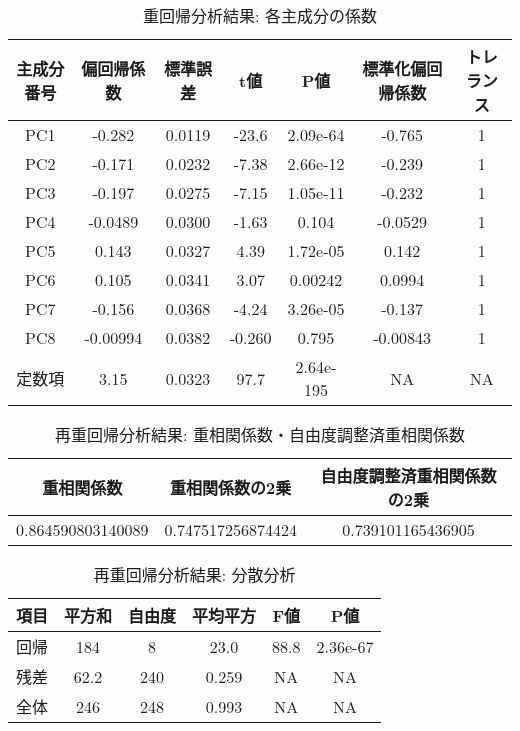 \documentclass[11pt,a4paper, uplatex]{jsarticle}
\begin{document}
\begin{table}[htbp]
  \begin{center}
    \caption{重回帰分析結果: 各主成分の係数}
    \begin{tabular}{c|c|c|c|c|c|c}
      \hline
      主成分番号 & 偏回帰係数 & 標準誤差 & t値 & P値 & 標準化偏回帰係数 & トレランス \\ \hline \hline
      PC1 & -0.282 & 0.0119 & -23.6 & 2.09e-64 & -0.765 & 1 \\
      PC2 & -0.171 & 0.0232 & -7.38 & 2.66e-12 & -0.239 & 1 \\
      PC3 & -0.197 & 0.0275 & -7.15 & 1.05e-11 & -0.232 & 1 \\
      PC4 & -0.0489 & 0.0300 & -1.63 & 0.104 & -0.0529 & 1 \\
      PC5 & 0.143 & 0.0327 & 4.39 & 1.72e-05 & 0.142 & 1 \\
      PC6 & 0.105 & 0.0341 & 3.07 & 0.00242 & 0.0994 & 1 \\
      PC7 & -0.156 & 0.0368 & -4.24 & 3.26e-05 & -0.137 & 1 \\
      PC8 & -0.00994 & 0.0382 & -0.260 & 0.795 & -0.00843 & 1 \\
      定数項 & 3.15 & 0.0323 & 97.7 & 2.64e-195 & NA & NA \\
    \end{tabular}
    \label{one}
  \end{center}
\end{table}

\begin{table}[htbp]
  \begin{center}
    \caption{再重回帰分析結果: 重相関係数・自由度調整済重相関係数}
    \begin{tabular}{c|c|c}
      \hline
      重相関係数 & 重相関係数の2乗 & 自由度調整済重相関係数の2乗 \\ \hline \hline
      0.864590803140089 & 0.747517256874424 & 0.739101165436905
    \end{tabular}
    \label{Rs}
  \end{center}
\end{table}

\begin{table}[htbp]
  \begin{center}
    \caption{再重回帰分析結果: 分散分析}
    \begin{tabular}{c|c|c|c|c|c}
      \hline
      項目 & 平方和 & 自由度 & 平均平方 & F値 & P値 \\ \hline \hline
      回帰 & 184 & 8 & 23.0 & 88.8 & 2.36e-67 \\
      残差 & 62.2 & 240 & 0.259 & NA & NA \\
      全体 & 246 & 248 & 0.993 & NA & NA \\
    \end{tabular}
    \label{annova}
  \end{center}
\end{table}
\end{document}
